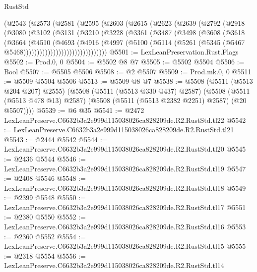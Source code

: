 \begin{lexlean}{RustStd}
\begin{coremodule}
      (@2543
        (@2573
          (@2581
            (@2595
              (@2603
                (@2615
                  (@2623
                    (@2639
                      (@2792
                        (@2918
                          (@3080
                            (@3102
                              (@3131
                                (@3210
                                  (@3228
                                    (@3361
                                      (@3487
                                        (@3498
                                          (@3608
                                            (@3618
                                              (@3664
                                                (@4510
                                                  (@4693
                                                    (@4916
                                                      (@4997
                                                        (@5100
                                                          (@5114
                                                            (@5261
                                                              (@5345
                                                                (@5467
                                                                  @5468)))))))))))))))))))))))))))))))
@5501 := LexLeanPreservation.Rust.Flags
@5502 := Prod.{0, 0}
@5504 := @5502 @8 @7
@5505 := @5502 @5504
@5506 := Bool
@5507 := @5505 @5506
@5508 := @2 @5507
@5509 := Prod.mk.{0, 0}
@5511 := @5509 @5504 @5506
@5513 := @5509 @8 @7
@5538 := @5508
    (@5511 (@5513 @204 @207) @2555)
    (@5508
      (@5511 (@5513 @330 @437) @2587)
      (@5508 (@5511 (@5513 @478 @13) @2587) (@5508 (@5511 (@5513 @2382 @2251) @2587) (@20 @5507))))
@5539 := @6 @35
@5541 := @2472 LexLeanPreserve.C6632b3a2e999d115038026ca828209de.R2.RustStd.tl22
@5542 := LexLeanPreserve.C6632b3a2e999d115038026ca828209de.R2.RustStd.tl21
@5543 := @2444 @5542
@5544 := LexLeanPreserve.C6632b3a2e999d115038026ca828209de.R2.RustStd.tl20
@5545 := @2436 @5544
@5546 := LexLeanPreserve.C6632b3a2e999d115038026ca828209de.R2.RustStd.tl19
@5547 := @2408 @5546
@5548 := LexLeanPreserve.C6632b3a2e999d115038026ca828209de.R2.RustStd.tl18
@5549 := @2399 @5548
@5550 := LexLeanPreserve.C6632b3a2e999d115038026ca828209de.R2.RustStd.tl17
@5551 := @2380 @5550
@5552 := LexLeanPreserve.C6632b3a2e999d115038026ca828209de.R2.RustStd.tl16
@5553 := @2360 @5552
@5554 := LexLeanPreserve.C6632b3a2e999d115038026ca828209de.R2.RustStd.tl15
@5555 := @2318 @5554
@5556 := LexLeanPreserve.C6632b3a2e999d115038026ca828209de.R2.RustStd.tl14

\end{coremodule}
\end{lexlean}
